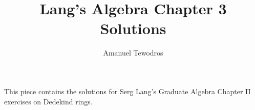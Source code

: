 \documentclass{article}
\theoremstyle{definition}
\theoremstyle{remark}
\begin{document}
\title{Lang's Algebra Chapter 3 Solutions}
\author{Amanuel Tewodros}



\newcommand{\size}[1]{|#1|}
\newcommand{\idx}[2]{[#1 : #2]}
\newcommand{\gen}[1]{\langle #1 \rangle}
\newcommand{\set}[1]{\{#1\}}
\newcommand{\normal}{\trianglelefteq}
\newcommand{\subgroup}{\leq}
\newcommand{\normalizer}[1]{\text{N}_{#1}}
\newcommand{\centerizer}{Z}
\newcommand{\aut}{\text{Aut}}
\newcommand{\inn}{\text{Inn}}
\newcommand{\syl}{\text{Syl}}
\newcommand{\sym}{\text{Sym}}
\newcommand{\alt}{\text{Alt}}
\newcommand{\id}{\text{id}}
\newcommand{\im}{\text{im}}
\newcommand{\orbit}[1]{\mathcal{O}_{#1}}
\newcommand{\ZZ}{\mathbb{Z}}
\newcommand{\C}[1]{\mathbb{Z}/#1\mathbb{Z}}
\newcommand{\iso}{\cong}
\newcommand{\dihedral}[1]{D_{#1}}
\newcommand{\dicyc}{\text{DiC}}
\newcommand{\hol}{\text{Hol}}
\newcommand{\I}[1]{\mathfrak{#1}} 
\newcommand{\Map}{\mathrm{Map}}
\newcommand{\nequiv}{\not \equiv}
\newcommand{\cat}[1]{\mathcal{#1}}
\newcommand{\Cat}{\mathcal{C}}
\newcommand{\Mor}{\text{Mor}}
\newcommand{\Ob}{\text{Ob}}
\newcommand{\End}{\text{End}}
\newcommand{\horline}{\noindent\rule{\textwidth}{1pt} \newline}
\newcommand{\Img}{\mathrm{Im}\ }
\newcommand{\Hom}{\mathrm{Hom}}
\newcommand{\fto}[1]{\overset{#1}{\to}}
\newcommand{\from}{\leftarrow}
\newcommand{\m}[1]{\mathfrak{#1}}
\newcommand{\dual}[1]{#1^{\vee}}
\newcommand{\ddual}[1]{#1^{\vee \vee}}
\newcommand{\rank}{\mathrm{rank}}
\newcommand{\tor}[1]{#1_{\mathrm{tor}}}
\newcommand{\dirlim}{\underrightarrow{\lim}}
\newcommand{\localize}[2]{{#1}^{-1}#2}
This piece contains the solutions for Serg Lang's Graduate Algebra Chapter II exercises on Dedekind rings.
\end{document}
